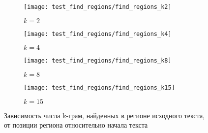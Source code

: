 \documentclass{main.tex}[subfiles]
\begin{document}
\setcounter{figure}{0}
\setcounter{table}{0}

\newpage
{}

%

\begin{figure}[H]
    \centering
    \begin{subfigure}{.5\textwidth}
        \centering
        \texttt{[image: test\_find\_regions/find\_regions\_k2]}
        \caption{$ k = 2 $}
    \end{subfigure}%
    \begin{subfigure}{.5\textwidth}
        \centering
        \texttt{[image: test\_find\_regions/find\_regions\_k4]}
        \caption{$ k = 4 $}
    \end{subfigure}

    \begin{subfigure}{.5\textwidth}
        \centering
        \texttt{[image: test\_find\_regions/find\_regions\_k8]}
        \caption{$ k = 8 $}
    \end{subfigure}%
    \begin{subfigure}{.5\textwidth}
        \centering
        \texttt{[image: test\_find\_regions/find\_regions\_k15]}
        \caption{$ k = 15 $}
    \end{subfigure}
    \caption{Зависимость числа k-грам, найденных в регионе исходного текста, от позиции региона относительно начала текста}
    \label{fig:find_k}
\end{figure}
\end{document}
